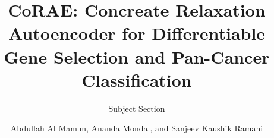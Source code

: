 \documentclass{bioinfo}
\begin{document}

\subtitle{Subject Section}

\title[short Title]{
CoRAE: Concreate Relaxation Autoencoder for Differentiable Gene Selection and Pan-Cancer Classification
}
\author[Sample \textit{et~al}.]{Abdullah Al Mamun, Ananda Mondal, and Sanjeev Kaushik Ramani}

\address{
School of Computing and Information Sciences, Miami, US \\
}



\end{document}
